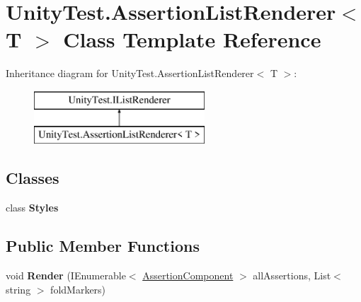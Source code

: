 \hypertarget{class_unity_test_1_1_assertion_list_renderer}{}\section{Unity\+Test.\+Assertion\+List\+Renderer$<$ T $>$ Class Template Reference}
\label{class_unity_test_1_1_assertion_list_renderer}
Inheritance diagram for Unity\+Test.\+Assertion\+List\+Renderer$<$ T $>$\+:\begin{figure}[H]
\begin{center}
\leavevmode
\includegraphics[height=2.000000cm]{class_unity_test_1_1_assertion_list_renderer}
\end{center}
\end{figure}
\subsection*{Classes}
\begin{DoxyCompactItemize}
\item 
class {\bfseries Styles}
\end{DoxyCompactItemize}
\subsection*{Public Member Functions}
\begin{DoxyCompactItemize}
\item 
\mbox{\label{class_unity_test_1_1_assertion_list_renderer_a9d449903fd82e4dabd436b2cf55b1225}} 
void {\bfseries Render} (I\+Enumerable$<$ \hyperlink{class_unity_test_1_1_assertion_component}{Assertion\+Component} $>$ all\+Assertions, List$<$ string $>$ fold\+Markers)
\end{DoxyCompactItemize}
